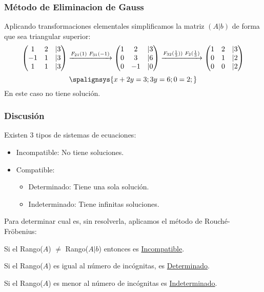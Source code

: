 \subsubsection{Método de Eliminacion de Gauss}
\noindent Aplicando transformaciones elementales simplificamos la matriz \((A|b)\) de forma que sea triangular superior:
\[
        \begin{pmatrix}
                1  & 2 & |3 \\
                -1 & 1 & |3 \\
                1  & 1 & |3
        \end{pmatrix}
        \xrightarrow[]{F_{21}(1) \hspace{1mm} F_{31}(-1)}
        \begin{pmatrix}
                1 & 2  & |3 \\
                0 & 3  & |6 \\
                0 & -1 & |0
        \end{pmatrix}
        \xrightarrow[]{F_{32}(\frac{1}{3})) \hspace{1mm} F_2(\frac{1}{3})}
        \begin{pmatrix}
                1 & 2 & |3 \\
                0 & 1 & |2 \\
                0 & 0 & |2
        \end{pmatrix}
\]
\[
        \spalignsys{
                x +  2y = 3 ;
                3y = 6 ;
                0 = 2 ;
        }
\]
\noindent En este caso no tiene solución.
\subsubsection{Discusión}
\noindent Existen 3 tipos de sistemas de ecuaciones:
\begin{itemize}
        \item Incompatible: No tiene soluciones.
        \item Compatible:
              \begin{itemize}
                      \item Determinado: Tiene una sola solución.
                      \item Indeterminado: Tiene infinitas soluciones.
              \end{itemize}
\end{itemize}
\noindent Para determinar cual es, sin resolverla, aplicamos el método de Rouché-Fröbenius:
\par Si el Rango(\(A\)) \( \neq \) Rango(\(A|b\)) entonces es \underline{Incompatible}.
\par Si el Rango(\(A\)) es igual al número de incógnitas, es \underline{Determinado}.
\par Si el Rango(\(A\)) es menor al número de incógnitas es \underline{Indeterminado}.
